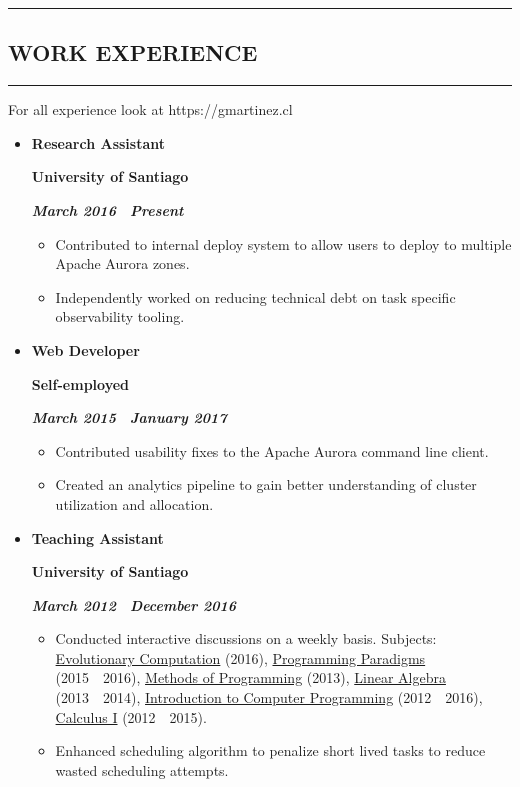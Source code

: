 \documentclass[10pt,letterpaper]{article}
\newcommand{\textbox}[1]{
  \parbox{.333\textwidth}{#1}
}
\newcommand{\sectionTitle}[1]{
  \hrule
  \vspace{-1.0em} 
  \subsection*{\uppercase{\textbf{#1}}}
  \vspace{-0.3em}
    \hrule
    \vspace{0.3em}  
}
\newcommand{\titleExperienceWithoutLocation}[4]{
  \vspace{1.0em}
  \item[]
  {
    \textbox{\textbf{#1}\hfill}\textbox{\hfil \textbf{#2}\hfil}\hfill \textbf{\emph{#3 \textendash \ #4}}
  }
}
\begin{document}
  \vspace{0.30em} 
  
  \sectionTitle{Work Experience}
  \noindent For all experience look at https://gmartinez.cl
  \vspace{-0.9em}
  \begin{itemize}[noitemsep,topsep=0pt]
    \titleExperienceWithoutLocation{Research Assistant}{University of Santiago}{March 2016}{Present}
      \begin{itemize}[label=\textbullet,noitemsep,topsep=0pt]
        \item Contributed to internal deploy system to allow users to deploy to multiple Apache Aurora zones.
        \item Independently worked on reducing technical debt on task specific observability tooling.
      \end{itemize}

    \vspace{-0.5em} 
    \titleExperienceWithoutLocation{Web Developer}{Self-employed}{March 2015}{January 2017}
      \begin{itemize}[label=\textbullet,noitemsep,topsep=0pt]
        \item Contributed usability fixes to the Apache Aurora command line client.
        \item Created an analytics pipeline to gain better understanding of cluster utilization and allocation.
      \end{itemize}
    
    \vspace{-0.5em} 
    \titleExperienceWithoutLocation{Teaching Assistant}{University of Santiago}{March 2012}{December 2016}
      \begin{itemize}[label=\textbullet]
        \itemsep0em
        \item Conducted interactive discussions on a weekly basis. Subjects: \ul{Evolutionary Computation} (2016), \ul{Programming Paradigms} (2015\ \textendash \ 2016), \ul{Methods of Programming} (2013), \ul{Linear Algebra} (2013\ \textendash \ 2014), \ul{Introduction to Computer Programming} (2012\ \textendash \ 2016), \ul{Calculus I} (2012\ \textendash \ 2015).
        \item Enhanced scheduling algorithm to penalize short lived tasks to reduce wasted scheduling attempts.
      \end{itemize}
  \end{itemize}
  \vspace{0.30em} 
  
\end{document}
